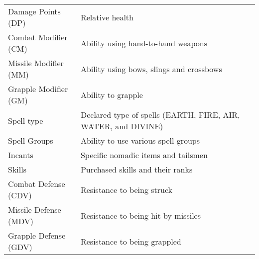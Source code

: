 \begin{tabular}{l l}
Damage Points (DP) & Relative health\\
Combat Modifier (CM) & Ability using hand-to-hand weapons\\
Missile Modifier (MM) & Ability using bows, slings and crossbows\\
Grapple Modifier (GM) & Ability to grapple\\
Spell type & Declared type of spells (EARTH, FIRE, AIR, WATER, and DIVINE)\\
Spell Groups & Ability to use various spell groups\\
Incants & Specific nomadic items and tailsmen\\
Skills & Purchased skills and their ranks\\
Combat Defense (CDV) & Resistance to being struck\\
Missile Defense (MDV) & Resistance to being hit by missiles\\
Grapple Defense (GDV) & Resistance to being grappled\\
\end{tabular}
